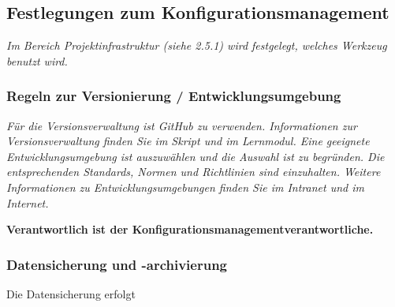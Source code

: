 \subsection{Festlegungen zum Konfigurationsmanagement}

\textit{Im Bereich Projektinfrastruktur (siehe 2.5.1) wird festgelegt, welches Werkzeug benutzt wird.}

\subsubsection{Regeln zur Versionierung / Entwicklungsumgebung}
\textit{
    Für die Versionsverwaltung ist GitHub zu verwenden. Informationen zur Versionsverwaltung finden Sie im Skript und im Lernmodul. Eine geeignete Entwicklungsumgebung ist auszuwählen und die Auswahl ist zu begründen. Die entsprechenden Standards, Normen und Richtlinien sind einzuhalten. Weitere Informationen zu Entwicklungsumgebungen finden Sie im Intranet und im Internet.
}

\textbf{Verantwortlich ist der Konfigurationsmanagementverantwortliche.}

\subsubsection{Datensicherung und -archivierung}

Die Datensicherung erfolgt 
